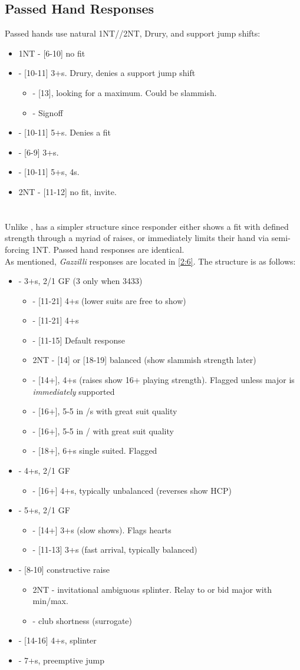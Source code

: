 \documentclass[12pt]{report}
\newcommand{\n}{\\}
\newcommand{\q}[1]{\multido{}{#1}{\qquad}}
\newcommand{\ul}[1]{\begin{itemize}#1\end{itemize}}
\newcommand{\li}[1]{\item[~] \q{#1}}
\newcommand{\bidsection}[2]{\section{\texorpdfstring{#1}{#2}}}
\begin{document}
\subsection{Passed Hand Responses}
    Passed hands use natural 1NT//2NT,  Drury, and support jump shifts:
    \ul{
        \li0 1NT - [6-10] no fit
        \li0 \cl2 - [10-11] 3+\he{}s.  Drury, denies a support jump shift \ul{
            \li0 \di2 - [13], looking for a maximum.  Could be slammish.
            \li0 \he2 - Signoff
        }

        \li0 \di2 - [10-11] 5+\di{}s.  Denies a fit
        \li0 \he2 - [6-9] 3+\he{}s.
        \li0 \sp2 - [10-11] 5+\sp{}s, 4\he{}s.
        \li0 2NT - [11-12] no fit, invite.
    }

\bidsection{}{1♠} \label{2:5}

    Unlike ,  has a simpler structure since responder either shows a fit with defined strength through a myriad of raises, or immediately limits their hand via semi-forcing 1NT. Passed hand responses are identical. \n

    As mentioned, \textit{Gazzilli} responses are located in \ref{2:6}.  The structure is as follows:

    \ul{
        \li0  - 3+\cl{}s, 2/1 GF (3 only when 3433) \ul{
            \li0 \di2 - [11-21] 4+\di{}s (lower suits are free to show)
            \li0 \he2 - [11-21] 4+\he{}s
            \li0 \sp2 - [11-15] Default response
            \li0 2NT - [14] or [18-19] balanced (show slammish strength later)
            \li0 \cl3 - [14+], 4+\cl{}s (raises show 16+ playing strength).  Flagged unless major is \textit{immediately} supported
            \li0 \di3 - [16+], 5-5 in \di{}/\sp{}s with great suit quality
            \li0 \he3 - [16+], 5-5 in \he{}/\sp{} with great suit quality
            \li0 \sp3 - [18+], 6+\sp{}s single suited.  Flagged
        }

        \li0 \di2 - 4+\di{}s, 2/1 GF \ul{
            \li0 \cl3 - [16+] 4+\cl{}s, typically unbalanced (reverses show HCP)
        }

        \li0 \he2 - 5+\he{}s, 2/1 GF \ul{
            \li0 \he3 - [14+] 3+\he{}s (slow shows).  Flags hearts
            \li0 \he4 - [11-13] 3+\he{}s (fast arrival, typically balanced)
        }

        \li0 \sp2 - [8-10] constructive raise \ul{
            \li0 2NT - invitational ambiguous splinter.  Relay to \cl3 or bid major with min/max.
                \li1 \cl3- club shortness (surrogate)
        }
    

        \li0 \he3 - [14-16] 4+\sp{}s, splinter
        \li0 \he4 - 7+\he{}s, preemptive jump
    }
\end{document}
